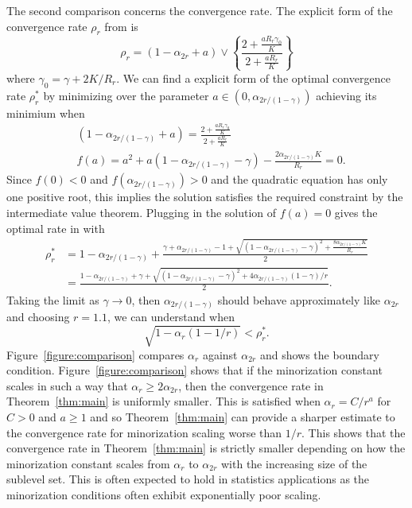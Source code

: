\documentclass[ejsv2, noshowframe]{imsart}
\theoremstyle{plain}
\theoremstyle{definition}
\theoremstyle{remark}
\begin{document}
The second comparison concerns the convergence rate. 
The explicit form of the convergence rate $\rho_{r}$ from \citep[Theorem 1.3]{hairer:mattingly:2011} is
\[
\rho_r 
= (1 - \alpha_{2r} + a) \vee \left\{ \frac{2 + \frac{a R_r \gamma_0}{K} }{2 + \frac{a R_r}{K}} \right\}
\]
where $\gamma_0 = \gamma + 2 K / R_r$.
We can find a explicit form of the optimal convergence rate $\rho^*_{r}$ by minimizing over the parameter $a \in (0, \alpha_{2r/(1-\gamma)})$ achieving its minimium when 
\begin{align*}
&(1 - \alpha_{2r/(1-\gamma)} + a) = \frac{2 + \frac{a R_r \gamma_0}{K} }{2 + \frac{a R_r}{K}}
\\
&f(a) = a^2 + a (1 - \alpha_{2r/(1-\gamma)} - \gamma) - \frac{2 \alpha_{2r/(1-\gamma)} K }{R_r} = 0.
\end{align*}
Since $f(0) < 0$ and $f(\alpha_{2r/(1-\gamma)}) > 0$ and the quadratic equation has only one positive root, this implies the solution satisfies the required constraint by the intermediate value theorem.
Plugging in the solution of $f(a) = 0$ gives the optimal rate in \citep[Theorem 1.3]{hairer:mattingly:2011} with
\begin{align}
\rho^*_r 
&= 1- \alpha_{2r/(1-\gamma)} + \frac{\gamma + \alpha_{2r/(1-\gamma)} - 1 + \sqrt{ (1 - \alpha_{2r/(1-\gamma)} - \gamma)^2 + \frac{8 \alpha_{2r/(1-\gamma)} K }{R_r}  }}{2}
\\
&= \frac{1 - \alpha_{2r/(1-\gamma)} + \gamma + \sqrt{ (1 - \alpha_{2r/(1-\gamma)} - \gamma)^2 + 4 \alpha_{2r/(1-\gamma)} (1 - \gamma) / r  }}{2}.
\label{eq:optimal_HM_rate}
\end{align}
Taking the limit as $\gamma \to 0$, then $\alpha_{2r/(1- \gamma)}$ should behave approximately like $\alpha_{2r}$ and choosing $r = 1.1$, we can understand when
\[
\sqrt{1 - \alpha_{r} (1 - 1/r)} < \rho^*_r.
\]
Figure~\ref{figure:comparison} compares $\alpha_r$ against $\alpha_{2r}$ and shows the boundary condition.
Figure~\ref{figure:comparison} shows that if the minorization constant scales in such a way that $\alpha_{r} \ge 2 \alpha_{2r}$, then the convergence rate in Theorem~\ref{thm:main} is uniformly smaller.
This is satisfied when $\alpha_{r} = C/r^a$ for $C > 0$ and $a \ge 1$ and so Theorem~\ref{thm:main} can provide a sharper estimate to the convergence rate for minorization scaling worse than $1/r$.
This shows that the convergence rate in Theorem~\ref{thm:main} is strictly smaller depending on how the minorization constant scales from $\alpha_{r}$ to $\alpha_{2r}$ with the increasing size of the sublevel set.
This is often expected to hold in statistics applications as the minorization conditions often exhibit exponentially poor scaling.
\end{document}
